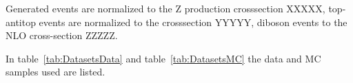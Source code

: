 
Generated events are normalized to the Z production crosssection XXXXX, top-antitop events are normalized to
the crosssection YYYYY, diboson events to the NLO cross-section ZZZZZ.

In table~\ref{tab:DatasetsData} and table~\ref{tab:DatasetsMC} the data and MC samples used are listed.

